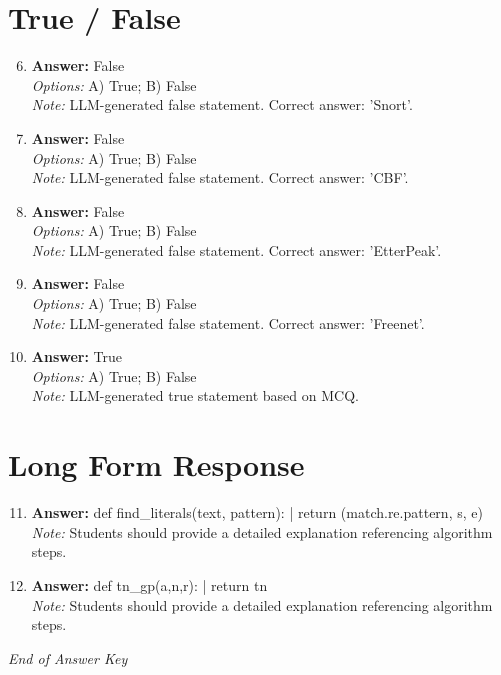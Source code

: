 \documentclass[12pt]{article}
\begin{document}
\section*{True / False}
\begin{enumerate}[label=\arabic*.]
\setcounter{enumi}{5}
\item \textbf{Answer:} False
\\ \textit{Options:} A) True; B) False
\\ \textit{Note:} LLM-generated false statement. Correct answer: 'Snort'.
\item \textbf{Answer:} False
\\ \textit{Options:} A) True; B) False
\\ \textit{Note:} LLM-generated false statement. Correct answer: 'CBF'.
\item \textbf{Answer:} False
\\ \textit{Options:} A) True; B) False
\\ \textit{Note:} LLM-generated false statement. Correct answer: 'EtterPeak'.
\item \textbf{Answer:} False
\\ \textit{Options:} A) True; B) False
\\ \textit{Note:} LLM-generated false statement. Correct answer: 'Freenet'.
\item \textbf{Answer:} True
\\ \textit{Options:} A) True; B) False
\\ \textit{Note:} LLM-generated true statement based on MCQ.
\end{enumerate}

\section*{Long Form Response}
\begin{enumerate}[label=\arabic*.]
\setcounter{enumi}{10}
\item \textbf{Answer:} def find\_literals(text, pattern): | return (match.re.pattern, s, e)
\\ \textit{Note:} Students should provide a detailed explanation referencing algorithm steps.
\item \textbf{Answer:} def tn\_gp(a,n,r): | return tn
\\ \textit{Note:} Students should provide a detailed explanation referencing algorithm steps.
\end{enumerate}

\vfill
\noindent\textit{End of Answer Key}
\end{document}
